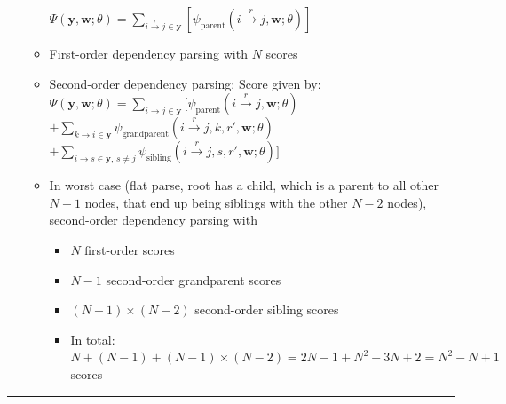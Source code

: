\begin{itemize}
\begin{itemize}
        $\Psi(\boldsymbol{y}, \boldsymbol{w}; \theta) =
        \sum_{i \xrightarrow{r} j \in \boldsymbol{y}} \left[ \psi_{\text{parent}}(i \xrightarrow{r} j, \boldsymbol{w}; \theta) \right]
        $
        \item First-order dependency parsing with $N$ scores
        \item Second-order dependency parsing: Score given by: $\Psi(\boldsymbol{y}, \boldsymbol{w}; \theta) =
        \sum_{i \to j \in \boldsymbol{y}} [ \psi_{\text{parent}}(i \xrightarrow{r} j, \boldsymbol{w}; \theta)$
        $+ \sum_{k \to i \in \boldsymbol{y}} \psi_{\text{grandparent}}(i \xrightarrow{r} j, k, r', \boldsymbol{w}; \theta)$
        $+ \sum_{i \to s \in \boldsymbol{y}, \, s \neq j} \psi_{\text{sibling}}(i \xrightarrow{r} j, s, r', \boldsymbol{w}; \theta) ]
        $
        \item In worst case (flat parse, root has a child, which is a parent to all other $N-1$ nodes, that end up being siblings with the other $N-2$ nodes), second-order dependency parsing with 
        \begin{itemize}
            \item $N$ first-order scores
            \item $N-1$ second-order grandparent scores
            \item $(N-1) \times (N-2)$ second-order sibling scores
            \item In total: $N + (N-1) + (N-1) \times (N-2) = 2N - 1 + N^2 -3N + 2 = N^2 - N + 1$ scores
        \end{itemize} 
    \end{itemize}
\end{itemize}

{\color{lightgray}\hrule height 0.001mm}

